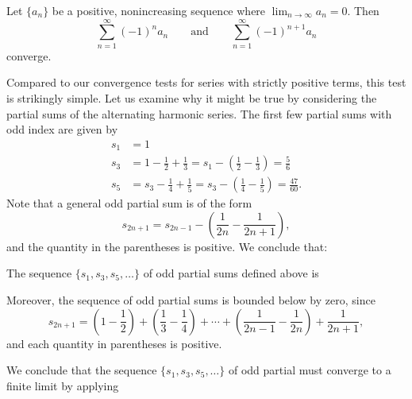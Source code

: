 \documentclass{ximera}
\begin{document}
\begin{theorem}
Let $\{a_n\}$ be a positive, nonincreasing sequence where
$\lim_{n\to\infty}a_n=0$. Then
\[
\sum_{n=1}^\infty (-1)^{n}a_n \qquad \text{and}\qquad \sum_{n=1}^\infty (-1)^{n+1}a_n 
\]
converge.
\end{theorem}

Compared to our convergence tests for series with strictly positive terms, this test is strikingly simple. Let us examine why it might be true by considering the partial sums of the alternating harmonic series. The first few partial sums with odd index are given by 
\begin{align*}
s_1 &= 1 \\
s_3 &= 1 - \frac{1}{2} + \frac{1}{3} = s_1 - \left(\frac{1}{2} - \frac{1}{3}\right) = \frac{5}{6} \\
s_5 &= s_3 - \frac{1}{4} + \frac{1}{5} = s_3 - \left( \frac{1}{4} - \frac{1}{5}\right) = \frac{47}{60}.
\end{align*}
Note that a general odd partial sum is of the form
$$
s_{2n+1} = s_{2n-1} - \left(\frac{1}{2n} - \frac{1}{2n+1}\right),
$$
and the quantity in the parentheses is positive. We conclude that:

\begin{question}
The sequence $\{s_1,s_3,s_5,\ldots\}$ of odd partial sums defined above is 
\begin{prompt}
        \begin{multipleChoice}
        \end{multipleChoice}
 \end{prompt}
 \end{question}
        
        

Moreover, the sequence of odd partial sums is bounded below by zero, since
$$
s_{2n+1} = \left(1 - \frac{1}{2}\right) + \left(\frac{1}{3} - \frac{1}{4}\right) + \cdots + \left(\frac{1}{2n-1}-\frac{1}{2n}\right) + \frac{1}{2n+1},
$$
and each quantity in parentheses is positive. 

\begin{question}
We conclude that the sequence $\{s_1,s_3,s_5,\ldots\}$ of odd partial must converge to a finite limit by applying
\begin{prompt}
        \begin{multipleChoice}
        \end{multipleChoice}
 \end{prompt}
 \end{question}
 
\end{document}

